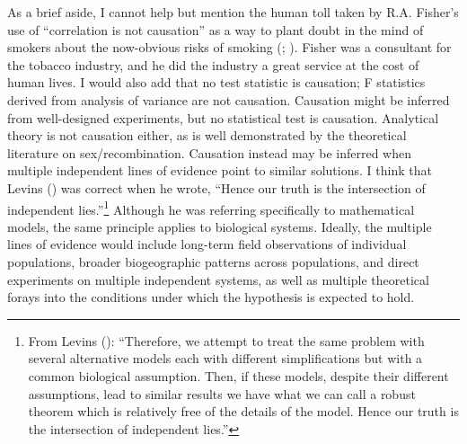 \documentclass[
  letterpaper,
]{book}
\begin{document}
As a brief aside, I cannot help but mention the human toll taken by R.A.
Fisher's use of ``correlation is not causation'' as a way to plant doubt
in the mind of smokers about the now-obvious risks of smoking
(;
). Fisher was a consultant for
the tobacco industry, and he did the industry a great service at the
cost of human lives. I would also add that no test statistic is
causation; F statistics derived from analysis of variance are not
causation. Causation might be inferred from well-designed experiments,
but no statistical test is causation. Analytical theory is not causation
either, as is well demonstrated by the theoretical literature on
sex/recombination. Causation instead may be inferred when multiple
independent lines of evidence point to similar solutions. I think that
Levins () was correct when he wrote,
``Hence our truth is the intersection of independent lies.''\footnote{From
  Levins (): ``Therefore, we attempt to
  treat the same problem with several alternative models each with
  different simplifications but with a common biological assumption.
  Then, if these models, despite their different assumptions, lead to
  similar results we have what we can call a robust theorem which is
  relatively free of the details of the model. Hence our truth is the
  intersection of independent lies.''} Although he was referring
specifically to mathematical models, the same principle applies to
biological systems. Ideally, the multiple lines of evidence would
include long-term field observations of individual populations, broader
biogeographic patterns across populations, and direct experiments on
multiple independent systems, as well as multiple theoretical forays
into the conditions under which the hypothesis is expected to hold.
\end{document}
